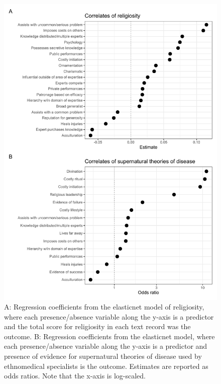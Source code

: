 \documentclass[
  11pt,
]{article}
\begin{document}
\begin{landscape}


\begin{figure}[p]

{\centering \includegraphics{magic-healers-article2_files/figure-latex/ehrafreligionLasso-1} 

}

\caption{A: Regression coefficients from the elasticnet model of religiosity, where each presence/absence variable along the y-axis is a predictor and the total score for religiosity in each text record was the outcome. B: Regression coefficients from the elasticnet model, where each presence/absence variable along the y-axis is a predictor and presence of evidence for supernatural theories of disease used by ethnomedical specialists is the outcome. Estimates are reported as odds ratios. Note that the x-axis is log-scaled.}\label{fig:ehrafreligionLasso}
\end{figure}





\end{landscape}
\end{document}

